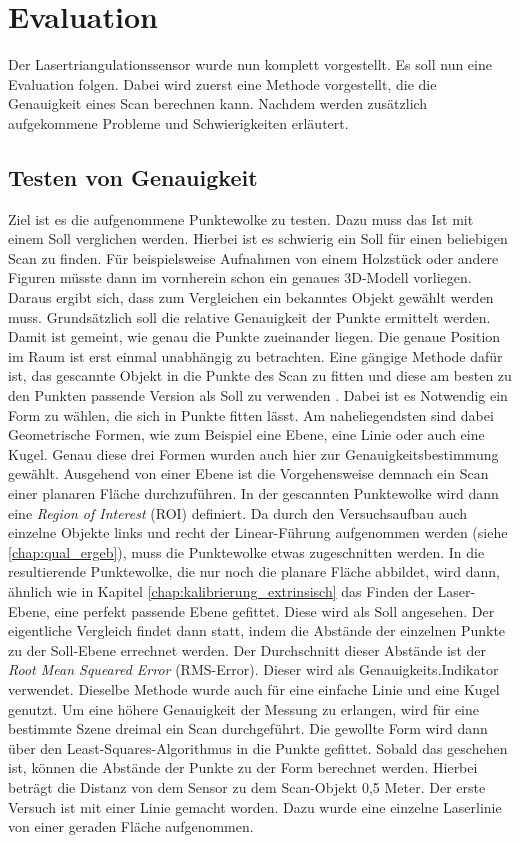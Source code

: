 \section{Evaluation}
		
		Der Lasertriangulationssensor wurde nun komplett vorgestellt. Es soll nun eine Evaluation folgen. Dabei wird zuerst eine Methode vorgestellt, die die Genauigkeit eines Scan berechnen kann. Nachdem werden zusätzlich aufgekommene Probleme und Schwierigkeiten erläutert.   
		\subsection{Testen von Genauigkeit}
		Ziel ist es die aufgenommene Punktewolke zu testen. Dazu muss das \glqq Ist\grqq{} mit einem \glqq Soll\grqq{} verglichen werden. Hierbei ist es schwierig ein \glqq Soll\grqq{} für einen beliebigen Scan zu finden. Für beispielsweise Aufnahmen von einem Holzstück oder andere Figuren müsste dann im vornherein schon ein genaues 3D-Modell vorliegen. Daraus ergibt sich, dass zum Vergleichen ein bekanntes Objekt gewählt werden muss. Grundsätzlich soll die relative Genauigkeit der Punkte ermittelt werden. Damit ist gemeint, wie genau die Punkte zueinander liegen. Die genaue Position im Raum ist erst einmal unabhängig zu betrachten. Eine gängige Methode dafür ist, das gescannte Objekt in die Punkte des Scan zu fitten und diese am besten zu den Punkten passende Version als \glqq Soll\grqq{} zu verwenden \citep{bart_accuracy_nodate} \citep{song_multi-view_2019}. Dabei ist es Notwendig ein Form zu wählen, die sich in Punkte fitten lässt. Am naheliegendsten sind dabei Geometrische Formen, wie zum Beispiel eine Ebene, eine Linie oder auch eine Kugel. Genau diese drei Formen wurden auch hier zur Genauigkeitsbestimmung gewählt. Ausgehend von einer Ebene ist die  Vorgehensweise demnach ein Scan einer planaren Fläche durchzuführen. In der gescannten Punktewolke wird dann eine \textit{Region of Interest} (ROI) definiert. Da durch den Versuchsaufbau auch einzelne Objekte links und recht der Linear-Führung aufgenommen werden (siehe \ref{chap:qual_ergeb}), muss die Punktewolke etwas zugeschnitten werden. In die resultierende Punktewolke, die nur noch die planare Fläche abbildet, wird dann, ähnlich wie in Kapitel \ref{chap:kalibrierung_extrinsisch} das Finden der Laser-Ebene, eine perfekt passende Ebene gefittet. Diese wird als \glqq Soll\grqq{} angesehen. Der eigentliche Vergleich findet dann statt, indem die Abstände der einzelnen Punkte zu der \glqq Soll\grqq-Ebene errechnet werden. Der Durchschnitt dieser Abstände ist der \textit{Root Mean Squeared Error} (RMS-Error). Dieser wird als Genauigkeits.Indikator verwendet. Dieselbe Methode wurde auch für eine einfache Linie und eine Kugel genutzt. Um eine höhere Genauigkeit der Messung zu erlangen, wird für eine bestimmte Szene dreimal ein Scan durchgeführt. Die gewollte Form wird dann über den Least-Squares-Algorithmus in die Punkte gefittet. Sobald das geschehen ist, können die Abstände der Punkte zu der Form berechnet werden. Hierbei beträgt die Distanz von dem Sensor zu dem Scan-Objekt 0,5 Meter. \newline
		Der erste Versuch ist mit einer Linie gemacht worden. Dazu wurde eine einzelne Laserlinie von einer geraden Fläche aufgenommen.  
		
